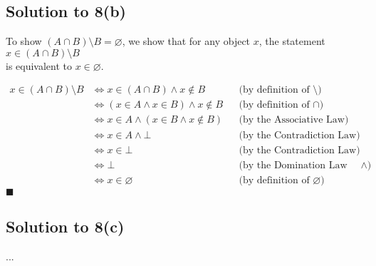 \documentclass{scrartcl}
\begin{document}
    \subsection*{Solution to 8(b)}
    To show $(A \cap B) \setminus B = \varnothing$, we show that for any object $x$, the statement $x \in (A \cap B) \setminus B$ \\ 
    is equivalent to $x \in \varnothing$.

    \begin{align*}
        x \in (A \cap B) \setminus B
        &\Leftrightarrow x \in (A \cap B) \wedge x \notin B
        && \text{(by definition of $\setminus$)} \\
        &\Leftrightarrow (x \in A \wedge x \in B) \wedge x \notin B
        && \text{(by definition of $\cap$)} \\
        &\Leftrightarrow x \in A \wedge (x \in B \wedge x \notin B)
        && \text{(by the Associative Law)} \\
        &\Leftrightarrow x \in A \wedge \bot
        && \text{(by the Contradiction Law)} \\
        &\Leftrightarrow x \in \bot
        && \text{(by the Contradiction Law)} \\
        &\Leftrightarrow \bot
        && \text{(by the Domination Law for $\wedge$)} \\
        &\Leftrightarrow x \in \varnothing
        && \text{(by definition of $\varnothing$)}
    \end{align*}
    \hfill $\blacksquare$


    \subsection*{Solution to 8(c)}
        ...

    \begin{align*}
    \end{align*}
\end{document}

